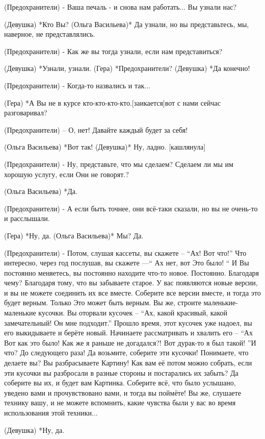 (Предохранители) - Ваша печаль - и снова нам работать... Вы узнали нас?

(Девушка) *Кто Вы?
(Ольга Васильева)* Да узнали, но вы представьтесь, мы, наверное, не представлялись.

(Предохранители) - Как же вы тогда узнали, если нам представиться?

(Девушка) *Узнали, узнали.
(Гера) *Предохранители?
(Девушка) *Да конечно!

(Предохранители) - Когда-то назвались и так...

(Гера) *А Вы не в курсе кто-кто-кто-кто.[заикается]вот с нами сейчас разговаривал?

(Предохранители) – О, нет! Давайте каждый будет за себя!

(Ольга Васильева) *Вот так!
(Девушка)* Ну, ладно. [кашлянула]

(Предохранители) - Ну, представьте, что мы сделаем? Сделаем ли мы им хорошую услугу, если Они не говорят.?

(Ольга Васильева) *Да.

(Предохранители) - А если быть точнее, они всё-таки сказали, но вы не очень-то и расслышали.

(Гера) *Ну, да.
(Ольга Васильева)* Мы? Да.

(Предохранители) - Потом, слушая кассеты, вы скажете – “Ах! Вот что!”  Что интересно, через год послушав, вы скажете —“ Ах нет, вот Это было! “ И Вы постоянно меняетесь, вы постоянно находите что-то новое. Постоянно. Благодаря чему? Благодаря тому, что вы забываете старое. У вас появляются новые версии, и вы не можете соединить их все вместе. Соберите все версии вместе, и тогда это будет верным. Только Это может быть верным. Вы же, строите маленькие-маленькие кусочки. Вы оторвали кусочек – “Ах, какой красивый, какой замечательный! Он мне подходит.”  Прошло время, этот кусочек уже надоел, вы его выкидываете и берёте новый. Начинаете рассматривать и хвалить его – “Ах Вот как это было! Как же я раньше не догадался?! Вот дурак-то я был такой! ”И что? До следующего раза! Да возьмите, соберите эти кусочки! Понимаете, что делаете вы? Вы разбрасываете Картину! Как вам её потом можно собрать, если эти кусочки вы разбросали в разные стороны и постарались их забыть? Да соберите вы их, и будет вам Картинка. Соберите всё, что было услышано, уведено вами и прочувствовано вами,  и тогда вы поймёте! Вы же, слушаете технику вашу, и не можете вспомнить, какие чувства были у вас во время использования этой техники...

(Девушка) *Ну, да.

